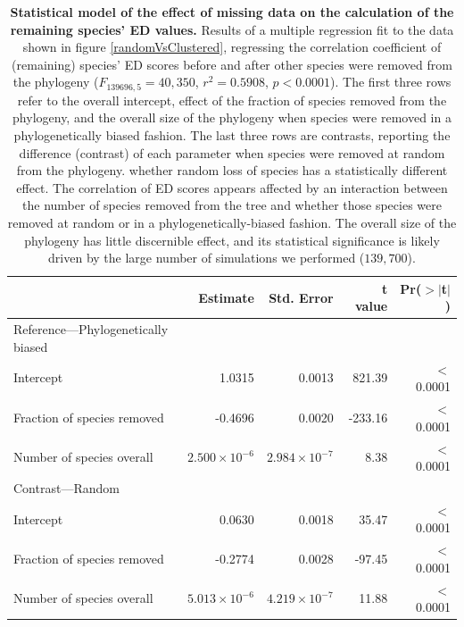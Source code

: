 \documentclass[10pt,english]{article}
\begin{document}
\begin{table}[ht]
  \centering
  \begin{tabular}{lrrrr}
    \hline
    & Estimate & Std. Error & t value & Pr($>$$|$t$|$) \\ \hline
    Reference---Phylogenetically biased\\
    Intercept & 1.0315 & 0.0013 & 821.39 & $<$0.0001 \\
    Fraction of species removed & -0.4696 & 0.0020 & -233.16 & $<$0.0001 \\
    Number of species overall & $2.500 \times 10^{-6}$ & $2.984 \times 10^{-7}$ & 8.38 & $<$0.0001 \\
    Contrast---Random\\
    Intercept & 0.0630 & 0.0018 & 35.47 & $<$0.0001 \\
    Fraction of species removed & -0.2774 & 0.0028 & -97.45 & $<$0.0001 \\
    Number of species overall & $5.013 \times 10^{-6}$ & $4.219 \times 10^{-7}$ & 11.88 & $<$0.0001 \\ \hline
  \end{tabular}
  \caption{\textbf{Statistical model of the effect of missing data on the
      calculation of the remaining species' ED values.} Results of a multiple
      regression fit to the data shown in figure \ref{randomVsClustered},
      regressing the correlation coefficient of (remaining) species' ED scores
      before and after other species were removed from the phylogeny
      ($F_{139696,5} = 40,350$, $r^{2} = 0.5908$, $p < 0.0001$). The first three
      rows refer to the overall intercept, effect of the fraction of species
      removed from the phylogeny, and the overall size of the phylogeny when
      species were removed in a phylogenetically biased fashion. The last three
      rows are contrasts, reporting the difference (contrast) of each parameter
      when species were removed at random from the phylogeny. whether random
      loss of species has a statistically different effect. The correlation of
      ED scores appears affected by an interaction between the number of species
      removed from the tree and whether those species were removed at random or
      in a phylogenetically-biased fashion. The overall size of the phylogeny
      has little discernible effect, and its statistical significance is likely
      driven by the large number of simulations we performed ($139,700$).}
\label{missing_regression}
\end{table}
\end{document}
